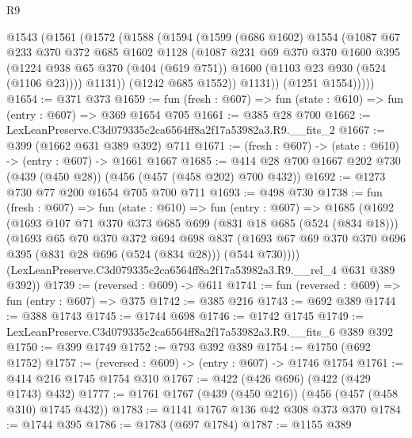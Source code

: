 \begin{lexlean}{R9}
\begin{coremodule}
      @1543
        (@1561
          (@1572
            (@1588
              (@1594
                (@1599
                  (@686 @1602)
                  @1554
                  (@1087
                    @67
                    @233
                    @370
                    @372
                    @685
                    @1602
                    @1128
                    (@1087
                      @231
                      @69
                      @370
                      @370
                      @1600
                      @395
                      (@1224
                        @938
                        @65
                        @370
                        (@404 (@619 @751))
                        @1600
                        (@1103 @23 @930 (@524 (@1106 @23))))
                      @1131))
                  (@1242 @685 @1552))
                @1131))
            (@1251 @1554)))))
@1654 := @371 @373
@1659 := fun (fresh : @607) => fun (state : @610) => fun (entry : @607) => @369 @1654 @705
@1661 := @385 @28 @700
@1662 := LexLeanPreserve.C3d079335c2ca6564ff8a2f17a53982a3.R9.__fits_2
@1667 := @399 (@1662 @631 @389 @392) @711
@1671 := (fresh : @607) -> (state : @610) -> (entry : @607) -> @1661 @1667
@1685 := @414 @28 @700 @1667 @202 @730 (@439 (@450 @28)) (@456 (@457 (@458 @202) @700 @432))
@1692 := @1273 @730 @77 @200 @1654 @705 @700 @711
@1693 := @498 @730
@1738 := fun (fresh : @607) =>
  fun (state : @610) =>
  fun (entry : @607) =>
  @1685
    (@1692
      (@1693
        @107
        @71
        @370
        @373
        @685
        @699
        (@831 @18 @685 (@524 (@834 @18)))
        (@1693
          @65
          @70
          @370
          @372
          @694
          @698
          @837
          (@1693 @67 @69 @370 @370 @696 @395 (@831 @28 @696 (@524 (@834 @28))) (@544 @730))))
      (LexLeanPreserve.C3d079335c2ca6564ff8a2f17a53982a3.R9.__rel_4 @631 @389 @392))
@1739 := (reversed : @609) -> @611
@1741 := fun (reversed : @609) => fun (entry : @607) => @375
@1742 := @385 @216
@1743 := @692 @389
@1744 := @388 @1743
@1745 := @1744 @698
@1746 := @1742 @1745
@1749 := LexLeanPreserve.C3d079335c2ca6564ff8a2f17a53982a3.R9.__fits_6 @389 @392
@1750 := @399 @1749
@1752 := @793 @392 @389
@1754 := @1750 (@692 @1752)
@1757 := (reversed : @609) -> (entry : @607) -> @1746 @1754
@1761 := @414 @216 @1745 @1754 @310
@1767 := @422 (@426 @696) (@422 (@429 @1743) @432)
@1777 := @1761 @1767 (@439 (@450 @216)) (@456 (@457 (@458 @310) @1745 @432))
@1783 := @1141 @1767 @136 @42 @308 @373 @370
@1784 := @1744 @395
@1786 := @1783 (@697 @1784)
@1787 := @1155 @389

\end{coremodule}
\end{lexlean}
